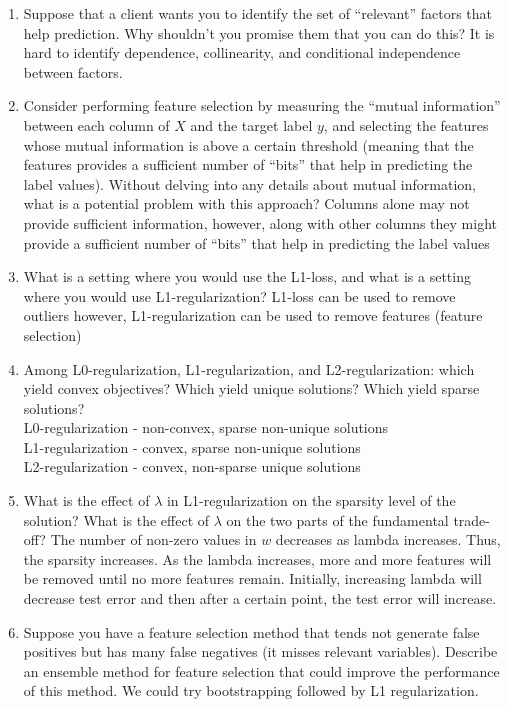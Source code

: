 \documentclass{article}
\def\red#1{{\color{red}#1}}
\def\enum#1{\begin{enumerate}#1\end{enumerate}}
\begin{document}
\enum{
\item Suppose that a client wants you to identify the set of ``relevant'' factors that help prediction. Why shouldn't you promise them that you can do this?
\red{It is hard to identify dependence, collinearity, and conditional independence between factors.}
\item Consider performing feature selection by measuring the ``mutual information'' between each column of $X$ and the target label $y$, and selecting the features whose mutual information is above a certain threshold (meaning that the features provides a sufficient number of ``bits'' that help in predicting the label values). Without delving into any details about mutual information, what is a potential problem with this approach? \red{Columns alone may not provide sufficient information, however, along with other columns they might provide a sufficient number of ``bits'' that help in predicting the label values}
\item What is a setting where you would use the L1-loss, and what is a setting where you would use L1-regularization? \red{L1-loss can be used to remove outliers however, L1-regularization can be used to remove features (feature selection)}
\item Among L0-regularization, L1-regularization, and L2-regularization: which yield convex objectives? Which yield unique solutions? Which yield sparse solutions? \\
\red{L0-regularization - non-convex, sparse non-unique solutions \\
L1-regularization - convex, sparse non-unique solutions \\
L2-regularization - convex, non-sparse unique solutions}
\item What is the effect of $\lambda$ in L1-regularization on the sparsity level of the solution? What is the effect of $\lambda$ on the two parts of the fundamental trade-off? \red{The number of non-zero values in $w$ decreases as lambda increases. Thus, the sparsity increases. As the lambda increases, more and more features will be removed until no more features remain. Initially, increasing lambda will decrease test error and then after a certain point, the test error will increase.}
\item Suppose you have a feature selection method that tends not generate false positives but has many false negatives (it misses relevant variables). Describe an ensemble method for feature selection that could improve the performance of this method. \red{We could try bootstrapping followed by L1 regularization.}
}
\end{document}
